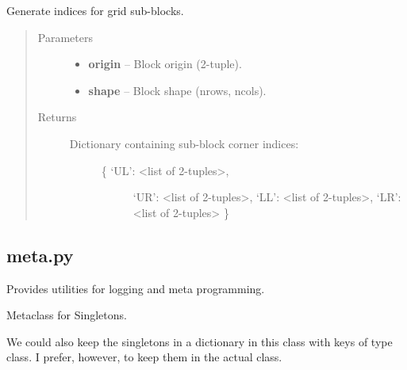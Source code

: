 \documentclass[letterpaper,10pt,english]{sphinxmanual}
\begin{document}
\begin{fulllineitems}
\label{docs/utilities:blrb.subdivide}
Generate indices for grid sub-blocks.
\begin{quote}\begin{description}
\item[{Parameters}] \leavevmode\begin{itemize}
\item {} 
\textbf{origin} -- Block origin (2-tuple).

\item {} 
\textbf{shape} -- Block shape (nrows, ncols).

\end{itemize}

\item[{Returns}] \leavevmode
\begin{description}
\item[{Dictionary containing sub-block corner indices:}] \leavevmode\begin{description}
\item[{\{ `UL': \textless{}list of 2-tuples\textgreater{},}] \leavevmode
`UR': \textless{}list of 2-tuples\textgreater{},
`LL': \textless{}list of 2-tuples\textgreater{},
`LR': \textless{}list of 2-tuples\textgreater{} \}

\end{description}

\end{description}


\end{description}\end{quote}

\end{fulllineitems}



\subsection{meta.py}
\label{docs/utilities:module-meta}\label{docs/utilities:meta-py}
Provides utilities for logging and meta programming.


\begin{fulllineitems}
\label{docs/utilities:meta.Singleton}
Metaclass for Singletons.

We could also keep the singletons in a dictionary in this class with keys
of type class. I prefer, however, to keep them in the actual class.

\end{fulllineitems}
\end{document}
